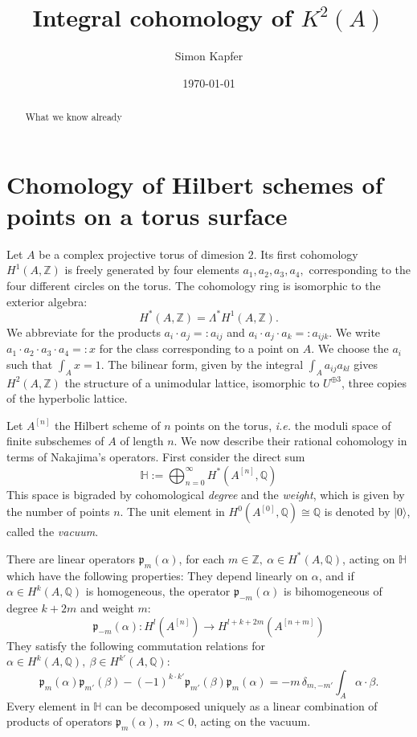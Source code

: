 \documentclass{amsart}
\newcommand{\hilb}[1]{^{[#1]}}
\newcommand{\ie}{{\it i.e. }}
\newcommand{\vac}{|0\rangle}
\newcommand{\p}{\mathfrak{p}}
\renewcommand{\H}{\mathbb{H}}
\newcommand{\Q}{\mathbb{Q}}
\newcommand{\Z}{\mathbb{Z}}
\theoremstyle{plain}
\theoremstyle{definition}
\theoremstyle{remark}
\begin{document}
\title{Integral cohomology of $K^2(A)$}


\author{Simon Kapfer}
\address{Simon Kapfer, Laboratoire de Math\'ematiques et Applications, UMR CNRS 6086, Universit\'e de Poitiers, T\'el\'eport 2, Boulevard Marie et Pierre Curie, F-86962 Futuroscope Chasseneuil}


\date{\today}


\begin{abstract} 
What we know already
\end{abstract}

\maketitle

\section{Chomology of Hilbert schemes of points on a torus surface}
Let $A$ be a complex projective torus of dimesion $2$. Its first cohomology $H^1(A,\Z)$ is freely generated by four elements $a_1,a_2,a_3,a_4,$ corresponding to the four different circles on the torus. The cohomology ring is isomorphic to the exterior algebra:
$$
H^*(A,\Z) = \Lambda^* H^1(A,\Z).
$$
We abbreviate for the products $a_i\cdot a_j =: a_{ij}$ and $a_i\cdot a_j\cdot a_k =: a_{ijk}$. We write $a_1\cdot a_2\cdot a_3 \cdot a_4 =:x$ for the class corresponding to a point on $A$. We choose the $a_i$ such that $\int_A x = 1$.
The bilinear form, given by the integral $\int_A a_{ij}a_{kl}$ gives $H^2(A,\Z)$ the structure of a unimodular lattice, isomorphic to $U^{\oplus 3}$, three copies of the hyperbolic lattice. 

Let $A\hilb{n}$ the Hilbert scheme of $n$ points on the torus, \ie the moduli space of finite subschemes of $A$ of length $n$. We now describe their rational cohomology in terms of Nakajima's operators. First consider the direct sum
$$
\H := \bigoplus_{n=0}^{\infty} H^*(A\hilb{n},\Q)
$$
This space is bigraded by cohomological \emph{degree} and the \emph{weight}, which is given by the number of points $n$. The unit element in $H^0(A\hilb{0},\Q) \cong \Q$ is denoted by $\vac$, called the \emph{vacuum}.

There are linear operators $\p_m(\alpha)$, for each $m\in \Z,\ \alpha \in H^*(A,\Q)$, acting on $\H$ which have the following properties: They depend linearly on $\alpha$, and if $\alpha\in H^k(A,\Q)$ is homogeneous, the operator $\p_{-m}(\alpha)$ is bihomogeneous of degree $k+2m$ and weight $m$:
$$
\p_{-m}(\alpha) : H^l(A\hilb{n}) \rightarrow H^{l+k+2m}(A\hilb{n+m})
$$
They satisfy the following commutation relations for $\alpha\in H^k(A,\Q),\ \beta\in H^{k'}(A,\Q)$:
$$
\p_{m}(\alpha)\p_{m'}(\beta) - (-1)^{k\cdot k'}\p_{m'}(\beta)\p_{m}(\alpha) = -m\,\delta_{m,-m'} \int_A \alpha\cdot\beta.
$$
Every element in $\H$ can be decomposed uniquely as a linear combination of products of operators $\p_{m}(\alpha),\ m<0$, acting on the vacuum. 
\end{document}
